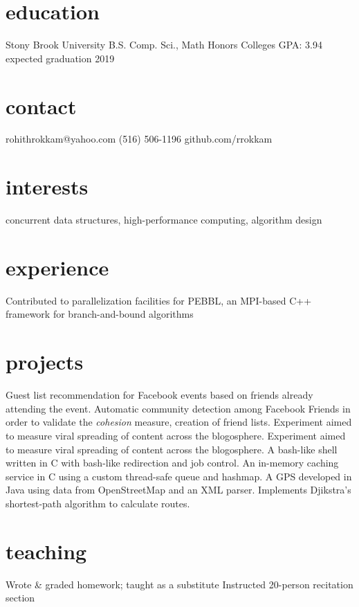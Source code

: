 \documentclass{cv}
\begin{document}

\begin{aside}
  \section{education}
    Stony Brook University
    B.S. Comp. Sci., Math
    Honors Colleges
    GPA: 3.94
    expected graduation 2019
  \section{contact}
    rohithrokkam@yahoo.com
    (516) 506-1196
    github.com/rrokkam
\end{aside}

\section{interests}

concurrent data structures, high-performance computing, algorithm design

\section{experience}

\begin{entrylist}
    {Contributed to parallelization facilities for PEBBL, an MPI-based C++ framework for branch-and-bound algorithms}
\end{entrylist}

\section{projects}

\begin{entrylist}
    {Guest list recommendation for Facebook events based on friends already attending the event.}
    {Automatic community detection among Facebook Friends in order to validate the \emph{cohesion} measure, creation of friend lists.}
    {Experiment aimed to measure viral spreading of content across the blogosphere.}
    {Experiment aimed to measure viral spreading of content across the blogosphere.}
    {A bash-like shell written in C with bash-like redirection and job control.}
    {An in-memory caching service in C using a custom thread-safe queue and hashmap.}
    {A GPS developed in Java using data from OpenStreetMap and an XML parser.
     Implements Djikstra's shortest-path algorithm to calculate routes.}
\end{entrylist}

\section{teaching}

\begin{entrylist}
    {Wrote \& graded homework; taught as a substitute}
    {Instructed 20-person recitation section}
\end{entrylist}
\end{document}
